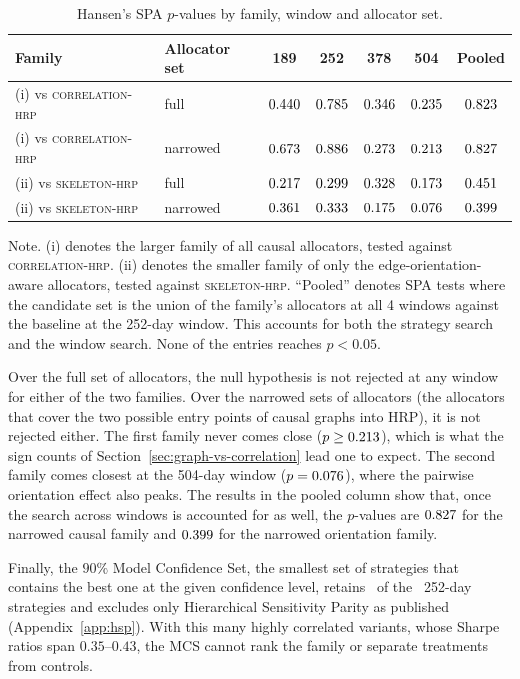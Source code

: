 \documentclass[11pt, a4paper]{report}
\newcommand{\corrhrp}{\textsc{correlation-hrp}}
\newcommand{\skelhrp}{\textsc{skeleton-hrp}}
\newcommand{\floatnote}[1]{\par\vspace{3pt}\begin{minipage}{0.92\textwidth}\footnotesize Note. #1\end{minipage}\par}
\begin{document}
\begin{table}[t]
  \centering
  \caption{Hansen's SPA $p$-values by family, window and allocator set.}
  \label{tab:spa}
  \small
  \begin{tabular}{l l c c c c c}
    \toprule
    Family & Allocator set & 189 & 252 & 378 & 504 & Pooled \\
    \midrule
    (i) vs \corrhrp{}      & full     & $0.440$ & $0.785$ & $0.346$ & $0.235$ & $0.823$ \\
    (i) vs \corrhrp{}      & narrowed & $0.673$ & $0.886$ & $0.273$ & $0.213$ & $0.827$ \\
    (ii) vs \skelhrp{} & full     & $0.217$ & $0.299$ & $0.328$ & $0.173$ & $0.451$ \\
    (ii) vs \skelhrp{} & narrowed & $0.361$ & $0.333$ & $0.175$ & $0.076$ & $0.399$ \\
    \bottomrule
  \end{tabular}
  \floatnote{(i) denotes the larger family of all causal allocators, tested against \corrhrp{}. (ii) denotes the smaller family of only the edge-orientation-aware allocators, tested against \skelhrp{}. ``Pooled'' denotes SPA tests where the candidate set is the union of the family's allocators at all 4 windows against the baseline at the 252-day window. This accounts for both the strategy search and the window search. None of the entries reaches $p<0.05$.}
\end{table}

Over the full set of allocators, the null hypothesis is not rejected at any window for either of the two families.
Over the narrowed sets of allocators (the allocators that cover the two possible entry points of causal graphs into HRP), it is not rejected either. The first family never comes close ($p \geq 0.213$), which is what the sign counts of Section~\ref{sec:graph-vs-correlation} lead one to expect. The second family comes closest at the 504-day window ($p=0.076$), where the pairwise orientation effect also peaks.
The results in the pooled column show that, once the search across windows is accounted for as well, the $p$-values are $0.827$ for the narrowed
causal family and $0.399$ for the narrowed orientation family.

Finally, the $90\%$ Model Confidence Set, the smallest set of strategies that contains the best one at the given confidence level, retains \rsMcsSize\ of the \rsMcsUniverse\ 252-day strategies and excludes only Hierarchical Sensitivity Parity as published (Appendix~\ref{app:hsp}).
With this many highly correlated variants, whose Sharpe ratios span $0.35$--$0.43$, the MCS cannot rank the family or separate treatments from controls.
\end{document}
